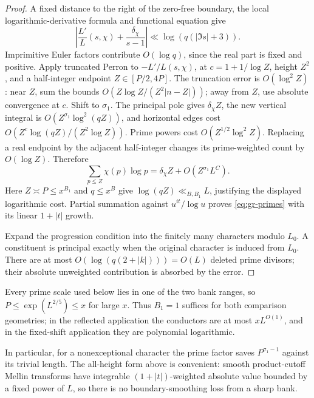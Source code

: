 \begin{proof}
A fixed distance to the right of the zero-free boundary, the local
logarithmic-derivative formula and functional equation give
\begin{equation}
 \left|\frac{L'}{L}(s,\chi)+\frac{\delta_\chi}{s-1}\right|
                 \ll \log(q(|\Im s|+3)).
 \label{eq:gr-logderivative}
\end{equation}
Imprimitive Euler factors contribute \(O(\log q)\), since the real
part is fixed and positive.
Apply truncated Perron to
\(-L'/L(s,\chi)\), at
\(c=1+1/\log Z\), height \(Z^2\), and a half-integer endpoint
\(Z\in[P/2,4P]\).
The truncation error is \(O(\log^2 Z)\): near \(Z\), sum the bounds
\(O(Z\log Z/(Z^2|n-Z|))\); away from \(Z\), use absolute convergence
at \(c\).  Shift to \(\sigma_1\).
The principal pole gives \(\delta_\chi Z\), the new vertical integral
is \(O(Z^{\sigma_1}\log^2(qZ))\), and horizontal edges cost
\(O(Z^c\log(qZ)/(Z^2\log Z))\).
Prime powers cost \(O(Z^{1/2}\log^2 Z)\).
Replacing a real endpoint by the adjacent half-integer changes its
prime-weighted count by \(O(\log Z)\).  Therefore
\[
       \sum_{p\le Z}\chi(p)\log p
          =\delta_\chi Z+O(Z^{\sigma_1}L^C).
\]
Here \(Z\asymp P\le x^{B_1}\) and \(q\le x^B\) give
\(\log(qZ)\ll_{B,B_1}L\), justifying the displayed logarithmic cost.
Partial summation against \(u^{it}/\log u\) proves
\eqref{eq:gr-primes} with its linear \(1+|t|\) growth.

Expand the progression condition into the finitely many characters
modulo \(L_0\).  A constituent is principal exactly when the original
character is induced from \(L_0\).
There are at most \(O(\log(q(2+|k|)))=O(L)\) deleted prime divisors;
their absolute unweighted contribution is absorbed by the error.
\end{proof}

Every prime scale used below lies in one of the two bank ranges,
so \(P\le\exp(L^{2/5})\le x\) for large \(x\). Thus \(B_1=1\)
suffices for both comparison geometries; in the reflected application
the conductors are at most \(xL^{O(1)}\), and in the fixed-shift
application they are polynomial logarithmic.

In particular, for a nonexceptional character the prime factor saves
\(P^{\sigma_1-1}\) against its trivial length.  The all-height form
above is convenient: smooth product-cutoff Mellin transforms have
integrable \((1+|t|)\)-weighted absolute value bounded by a fixed
power of \(L\), so there is no boundary-smoothing loss from a sharp bank.


